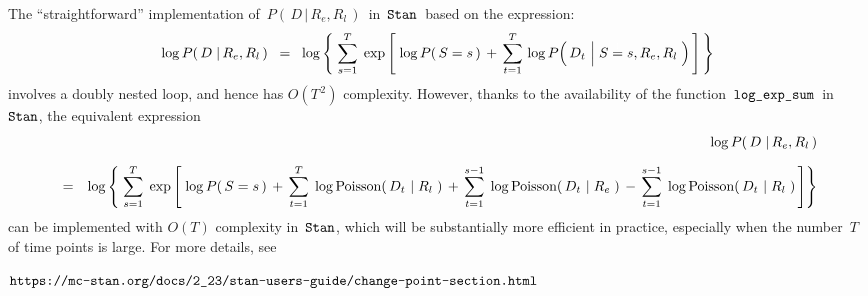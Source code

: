 \vskip 0.5cm
\begin{remark}
\mbox{}
\vskip 0.2cm
\noindent
The ``straightforward'' implementation of \,$P\!\left(\,D\,\vert\,R_{e},R_{l}\,\right)$\,
in \,$\textnormal{\texttt{Stan}}$\, based on the expression:
\begin{eqnarray*}
\underset{{\color{white}}}{\log P\!\left(\,D \;\vert\, R_{e},R_{l}\,\right)}
\;\; = \;\;
	\log\left\{\;
	\overset{T}{\underset{s=1}{\sum}}\;
	\exp\left[\;
		\log P\!\left(\,S=s\,\right)
		\, + \,
		\overset{T}{\underset{t=1}{\sum}}\,
		\log P\!\left(\,D_{t} \,\left\vert\; S\overset{{\color{white}1}}{=}s,R_{e},R_{l}\right.\,\right)
		\,\right]
	\,\right\}
\end{eqnarray*}
involves a doubly nested loop, and hence has $O(T^{\,2})$ complexity.
However, thanks to the availability of the function
\,$\textnormal{\texttt{log\_exp\_sum}}$\, in \,$\textnormal{\texttt{Stan}}$,
the equivalent expression
\begin{eqnarray*}
&&
	\underset{{\color{white}}}{\log P\!\left(\,D \;\vert\, R_{e},R_{l}\,\right)}
\\
&=&
	\log\left\{\;
	\overset{T}{\underset{s=1}{\sum}}\;
	\exp\left[\;
			\log P\!\left(\,S=s\,\right)
			\,+\,
			\overset{T}{\underset{t=1}{\sum}}\;
			\log\textnormal{Poisson}\!\left(\,D_{t} \,\left\vert\; R_{l}\right.\,\right)
			\,+\,
			\overset{s-1}{\underset{t=1}{\sum}}\;
			\log\textnormal{Poisson}\!\left(\,D_{t} \,\left\vert\; R_{e}\right.\,\right)
			\,-\,
			\overset{s-1}{\underset{t=1}{\sum}}\;
			\log\textnormal{Poisson}\!\left(\,D_{t} \,\left\vert\; R_{l}\right.\,\right)
		\,\right]
	\right\}
\end{eqnarray*}
can be implemented with $O(T)$ complexity in \,$\textnormal{\texttt{Stan}}$,
which will be substantially more efficient in practice, especially when the number \,$T$\, of time points is large.
For more details, see
\begin{center}
$\textnormal{\texttt{https://mc-stan.org/docs/2\_23/stan-users-guide/change-point-section.html}}$
\end{center}
\end{remark}

